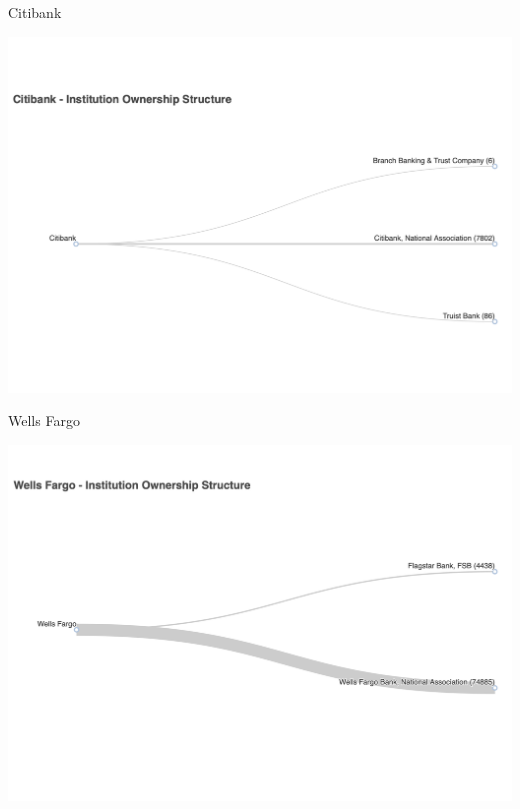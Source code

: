 \documentclass{beamer}
\begin{document}
\begin{frame}{Citibank}
\begin{center}
\includegraphics[width=1\textwidth]{figure/institution_ownership/Citibank_ownership_tree.pdf} 
\end{center}
\end{frame}


\begin{frame}{Wells Fargo}
\begin{center}
\includegraphics[width=1\textwidth]{figure/institution_ownership/Wells Fargo_ownership_tree.pdf} 
\end{center}
\end{frame}
\end{document}
